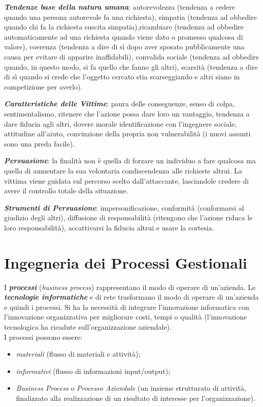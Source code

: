 \documentclass[a4paper, notitlepage, 9pt]{extreport}
\begin{document}
\noindent
\textit{\textbf{Tendenze base della natura umana}}: autorevolezza (tendenza a cedere quando una persona autorevole fa una richiesta), simpatia (tendenza ad obbedire quando chi fa la richiesta suscita simpatia),ricambiare (tendenza ad obbedire automaticamente ad una richiesta quando viene dato o promesso qualcosa di valore), coerenza (tendenza a dire di sì dopo aver sposato pubblicamente una causa per evitare di apparire inaffidabili), convalida sociale (tendenza ad obbedire quando, in questo modo, si fa quello che fanno gli altri), scarsità (tendenza a dire di sì quando si crede che l’oggetto cercato stia scarseggiando e altri siano in competizione per averlo).

\noindent
\textit{\textbf{Caratteristiche delle Vittime}}: paura delle conseguenze, senso di colpa, sentimentalismo, ritenere che l’azione possa dare loro un vantaggio, tendenza a dare fiducia agli altri, dovere morale identificazione con l'ingegnere sociale, attitudine all'aiuto, convinzione della propria non vulnerabilità (i nuovi assunti sono una preda facile).

\noindent
\textit{\textbf{Persuasione}}: la finalità non è quella di forzare un individuo a fare qualcosa ma quella di aumentare la sua volontaria condiscendenza alle richieste altrui. La vittima viene guidata sul percorso scelto dall’attaccante, lasciandole credere di avere il controllo totale della situazione.

\noindent
\textit{\textbf{Strumenti di Persuasione}}: impersonificazione, conformità (conformarsi al giudizio degli altri), diffusione di responsabilità (ritengono che l’azione riduca le loro responsabilità), accattivarsi la fiducia altrui e usare la cortesia.


\chapter*{Ingegneria dei Processi Gestionali}
I \textit{\textbf{processi}} (\textit{business process}) rappresentano il modo di operare di un’azienda. Le \textit{\textbf{tecnologie informatiche}} e di rete trasformano il modo di operare di un’azienda e quindi i processi. Si ha la necessità di integrare l’innovazione informatica con l’innovazione organizzativa per migliorare costi, tempi o qualità (l'innovazione tecnologica ha ricadute sull’organizzazione aziendale).\\
I processi possono essere:
\begin{itemize}
	\item \textit{materiali} (flusso di materiali e attività);
	\item \textit{informativi} (flusso di informazioni input/output);
	\item \textit{Business Process} o \textit{Processo Aziendale} (un insieme strutturato di attività, finalizzato alla realizzazione di un risultato di interesse per l’organizzazione).
\end{itemize}
\end{document}
